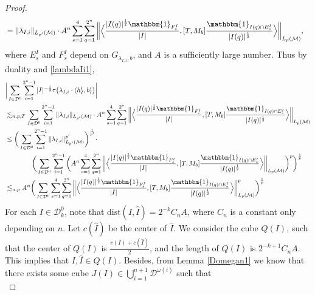 \documentclass[oneside,english,a4wide]{amsart}
\numberwithin{equation}{section}
\numberwithin{figure}{section}
\theoremstyle{plain}
\theoremstyle{plain}
\theoremstyle{definition}
\theoremstyle{plain}
\theoremstyle{remark}
\theoremstyle{definition}
\theoremstyle{remark}
\theoremstyle{definition}
\newcommand{\8}{\infty}
\begin{document}
\begin{proof}
\begin{equation*}
\begin{aligned}
			&=\|\lambda_{I,i}\|_{L_{p'}(\mathcal{M})}\cdot A^{n}\sum_{s=1}^4\sum_{q=1}^{2^n}\bigg\|\Big\langle \frac{|I(q)|^{\frac{1}{2}}\mathbbm{1}_{F_s^I}}{|I|}, [T,M_b]\frac{\mathbbm{1}_{I(q)\cap E_s^I}}{|I(q)|^{\frac{1}{2}}}\Big\rangle\bigg\|_{L_p(\mathcal{M})},
		\end{aligned}
	\end{equation*}
	where $E_s^I$ and $F_s^I$ depend on $G_{\lambda_{I,i},b}$, and $A$ is a sufficiently large number. Thus by duality and \eqref{lambdaIi1},
	\begin{equation*}
		\begin{aligned}
			{}&\bigg|\sum_{I\in\mathcal{D}^0}\sum_{i=1}^{2^n-1} |I|^{-\frac{1}{2}}\tau\big(\lambda_{I,i}\cdot\langle h_I^i,b\rangle \big)\bigg|\\
			&\lesssim_{n, p,T} \sum_{I\in\mathcal{D}^0}\sum_{i=1}^{2^n-1}  \|\lambda_{I,i}\|_{L_{p'}(\mathcal{M})}\cdot A^{n}\sum_{s=1}^4\sum_{q=1}^{2^n}\bigg\|\Big\langle \frac{|I(q)|^{\frac{1}{2}}\mathbbm{1}_{F_s^I}}{|I|}, [T,M_b]\frac{\mathbbm{1}_{I(q)\cap E_s^I}}{|I(q)|^{\frac{1}{2}}}\Big\rangle\bigg\|_{L_p(\mathcal{M})}\\
			&\le
			\bigg(\sum_{I\in\mathcal{D}^0}\sum_{i=1}^{2^n-1}\|\lambda_{I,i}\|^{p'}_{L_{p'}(\mathcal{M})}\bigg)^{\frac{1}{p'}}
			 \cdot\\
			& \quad\quad\quad\quad\bigg(\sum_{I\in\mathcal{D}^0}\sum_{i=1}^{2^n-1}\bigg(A^{n}\sum_{s=1}^4\sum_{q=1}^{2^n}\bigg\|\Big\langle \frac{|I(q)|^{\frac{1}{2}}\mathbbm{1}_{F_s^I}}{|I|}, [T,M_b]\frac{\mathbbm{1}_{I(q)\cap E_s^I}}{|I(q)|^{\frac{1}{2}}}\Big\rangle\bigg\|_{L_p(\mathcal{M})}\bigg)^p\bigg)^{\frac{1}{p}}\\
			&\lesssim_{n,p} A^n\bigg(\sum_{I\in\mathcal{D}^0}\sum_{s=1}^4\sum_{q=1}^{2^n}\bigg\|\Big\langle \frac{|I(q)|^{\frac{1}{2}}\mathbbm{1}_{F_s^I}}{|I|}, [T,M_b]\frac{\mathbbm{1}_{I(q)\cap E_s^I}}{|I(q)|^{\frac{1}{2}}}\Big\rangle\bigg\|_{L_p(\mathcal{M})}^p\bigg)^{\frac{1}{p}}
		\end{aligned}
	\end{equation*}
	For each $I\in\mathcal{D}^0_k$, note that $\mathrm{dist}(I,\hat{I})=2^{-k}C_nA$, where $C_n$ is a constant only depending on $n$. Let $c(\hat{I})$ be the center of $\hat{I}$. We consider the cube $Q(I)$, such that the center of $Q(I)$ is $\frac{c(I)+c(\hat{I})}{2}$, and the length of $Q(I)$ is $2^{-k+1}C_nA$. This implies that $I,\hat{I}\in Q(I)$. Besides, from Lemma \ref{Domegan1} we know that there exists some cube $J(I)\in\bigcup\limits_{i=1}^{n+1} \mathcal{D}^{\omega(i)}$ such that
		\begin{equation*}

\end{equation*}
\end{proof}
\end{document}
